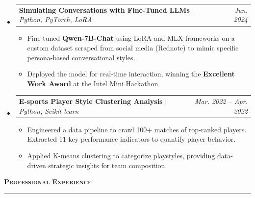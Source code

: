 \documentclass[11pt,letterpaper]{article}
\makeatletter
\newcommand{\cvsection}[1]{%
  \vspace{10pt} 
  {\noindent\Large\bfseries\scshape #1} 
  \par           
  \vspace{2pt}   
  \hrule         
  \vspace{6pt}   
}
\newcommand{\headerrow}[2]
{\begin{tabular*}{\linewidth}{l@{\extracolsep{\fill}}r}
#1 &
#2 \\
\end{tabular*}}
\makeatother
\begin{document}
\begin{itemize}
    \item 
    \headerrow
    {\textbf{Simulating Conversations with Fine-Tuned LLMs} $|$ \emph{Python, PyTorch, LoRA}}
    {\emph{Jun. 2024}}
    \begin{itemize}
        \item Fine-tuned \textbf{Qwen-7B-Chat} using LoRA and MLX frameworks on a custom dataset scraped from social media (Rednote) to mimic specific persona-based conversational styles.
        \item Deployed the model for real-time interaction, winning the \textbf{Excellent Work Award} at the Intel Mini Hackathon.
    \end{itemize}
    
    \vspace{4pt}

    \item 
    \headerrow
    {\textbf{E-sports Player Style Clustering Analysis} $|$ \emph{Python, Scikit-learn}}
    {\emph{Mar. 2022 – Apr. 2022}}
    \begin{itemize}
        \item Engineered a data pipeline to crawl 100+ matches of top-ranked players. Extracted 11 key performance indicators to quantify player behavior.
        \item Applied K-means clustering to categorize playstyles, providing data-driven strategic insights for team composition.
    \end{itemize}
\end{itemize}

\cvsection{Professional Experience}
\end{document}
